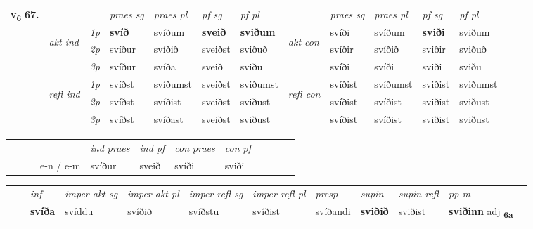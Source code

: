 \begin{tabular}{llllllllllll} \toprule
\multirow{4}{*}{{{\textbf{v{\textsubscript{6}}} \Large{\textbf{67.}}}}}  & &   &  \textit{praes sg}  & \textit{praes pl}  &\textit{ pf sg} & \textit{pf pl} &  &  \textit{praes sg}  & \textit{praes pl}  & \textit{pf sg} & \textit{pf pl } \\*
	\cmidrule{4-7} \cmidrule{9-12}
 & \multirow{3}{*}{\begin{turn}{90}\textit{akt ind}\end{turn}} & {\textit{1p}} & \textbf{svíð} & svíðum    & \textbf{sveið} & \textbf{sviðum} & \multirow{3}{*}{\begin{turn}{90}\textit{akt con}\end{turn}} &svíði & svíðum & \textbf{sviði} & sviðum\\*
& &  {\textit{2p}} &  svíður  & svíðið   & sveiðst & sviðuð & & svíðir & svíðið & sviðir & sviðuð \\*
& &  {\textit{3p}} & svíður & svíða   & sveið & sviðu & & svíði & svíði& sviði & sviðu  \\*
\cmidrule{4-7} \cmidrule{9-12}
 &\multirow{3}{*}{\begin{turn}{90}\textit{refl ind}\end{turn}} & {\textit{1p}} & svíðst & svíðumst    & sveiðst & sviðumst & \multirow{3}{*}{\begin{turn}{90}\textit{refl con}\end{turn}}  &svíðist & svíðumst & sviðist & sviðumst\\*
 &&  {\textit{2p}} &  svíðst  & svíðist   & sveiðst & sviðust & &svíðist & svíðist & sviðist & sviðust \\*
& &  {\textit{3p}} & svíðst & svíðast   & sveiðst & sviðust & & svíðist & svíðist& sviðist & sviðust  \\*
\cmidrule{4-7} \cmidrule{9-12}
\end{tabular}


\begin{tabular}{llllllllllll}
 & &  & &  \textit{ind praes} & \textit{ind pf} & \textit{con praes} & \textit{con pf} \\*
&  & & e-n / e-m & svíður & sveið & svíði & sviði \\*
\cmidrule{5-9}
\end{tabular}


\begin{tabular}{llllllllllll}
 & & \textit{inf} & \textit{imper akt sg} & \textit{imper akt pl} & \textit{imper refl sg} & \textit{imper refl pl} & \textit{presp} & \textit{supin} & \textit{supin refl} & \textit{pp m}     \\*
  & & \textbf{svíða} & svíddu  & svíðið & svíðstu & svíðist & svíðandi &  \textbf{sviðið} & sviðist & \textbf{sviðinn} adj \textbf{\textsubscript{6a}} \\*
\cmidrule{1-12}
\end{tabular}




